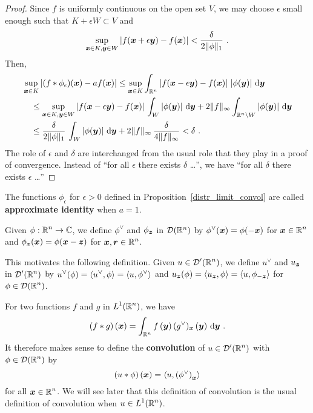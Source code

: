 \begin{proof}
Since $f$ is uniformly continuous on the open set $V$, we may choose
$\epsilon$ small enough such that $K+\epsilon W \subset V$ and
\[
\sup_{{\bm{x}}\in K,{\bm{y}}\in W} \left| f({\bm{x}}+\epsilon {\bm{y}})
-f({\bm{x}})\right| < \frac{\delta}{2\|\phi\|_1} \ .
\]
Then,
\begin{align*}
&\sup_{{\bm{x}}\in K} \left| (f\ast \phi_\epsilon)({\bm{x}}) - a f({\bm{x}}) \right|
\leq \sup_{{\bm{x}}\in K} 
\int_{\mathbb{R}^n} \left| f({\bm{x}}-\epsilon {\bm{y}})
 - f({\bm{x}})\right| \, \left|\phi({\bm{y}})\right| \,\mathrm{d}{{\bm{y}}} \\
&\quad \leq \sup_{{\bm{x}}\in K, {\bm{y}} \in W} 
\left| f({\bm{x}}-\epsilon {\bm{y}}) - f({\bm{x}})\right|
\, \int_{W} \left|\phi({\bm{y}})\right| \,\mathrm{d}{{\bm{y}}} + 2 \| f \|_\infty
\int_{\mathbb{R}^n\setminus W}\left|\phi({\bm{y}})\right| \,\mathrm{d}{{\bm{y}}} \\
&\quad \leq \frac{\delta}{2 \|\phi\|_1} \,
\int_{W} \left|\phi({\bm{y}})\right| \,\mathrm{d}{{\bm{y}}}
+ 2 \| f \|_\infty \, \frac{\delta}{4\|f\|_\infty} < \delta \ .
\end{align*}
The role of $\epsilon$ and $\delta$ are interchanged from the usual
role that they play in a proof of convergence.  Instead of ``for all
$\epsilon$ there exists $\delta$ \ldots'', we have ``for all $\delta$
there exists $\epsilon$ \ldots''
\end{proof}

\begin{defn}
The functions $\phi_\epsilon$ for $\epsilon>0$ defined in
Proposition~\ref{distr_limit_convol} are called
{\bfseries approximate identity} when $a=1$.
\end{defn}

Given $\displaystyle \phi:\mathbb{R}^n \rightarrow \mathbb{C}$, we define
$\displaystyle \phi^\vee$ and
$\displaystyle \phi_{{\bm{z}}}$ in $\mathcal{D}(\mathbb{R}^n)$ by
$\displaystyle \phi^{\vee}({\bm{x}}) = \phi(-{\bm{x}})$ for
$\displaystyle {\bm{x}} \in \mathbb{R}^n$ and
$\displaystyle \phi_{{\bm{z}}}({\bm{x}}) = \phi({\bm{x}}-{\bm{z}})$
for $\displaystyle {\bm{x}}, {\bm{r}} \in \mathbb{R}^n$.

This motivates the following definition.  Given
$\displaystyle u \in \mathcal{D}'(\mathbb{R}^n)$,
we define $\displaystyle u^\vee$ and $u_{{\bm{z}}}$ in
$\displaystyle \mathcal{D}'(\mathbb{R}^n)$ by
$\displaystyle u^\vee(\phi) = \left\langle{u^\vee} , {\phi}\right\rangle = \left\langle{u} , {\phi^\vee}\right\rangle$
and
$\displaystyle u_{{\bm{z}}}(\phi) = \left\langle{u_{{\bm{z}}}} , {\phi}\right\rangle
= \left\langle{u} , {\phi_{-{\bm{z}}}}\right\rangle$ for $\displaystyle \phi \in \mathcal{D}(\mathbb{R}^n)$.

For two functions $f$ and $g$ in $\displaystyle L^1(\mathbb{R}^n)$, we have
\[
(f\ast g)\left({\bm{x}}\right) = \int_{\mathbb{R}^n} f\left({\bm{y}}\right)
(g^\vee)_{{\bm{x}}}\left({\bm{y}}\right)\,\mathrm{d}{{\bm{y}}} \ .
\]
It therefore makes sense to define the
{\bfseries convolution} of
$\displaystyle u\in \mathcal{D}'(\mathbb{R}^n)$ with $\displaystyle \phi\in \mathcal{D}(\mathbb{R}^n)$ by
\[
\left( u \ast \phi\right)({\bm{x}}) =
\left\langle{u} , {\left(\phi^{\vee}\right)_{{\bm{x}}}}\right\rangle
\]
for all $\displaystyle {\bm{x}} \in \mathbb{R}^n$.
We will see later that this definition of convolution is the usual
definition of convolution when $\displaystyle u\in L^1(\mathbb{R}^n)$.

